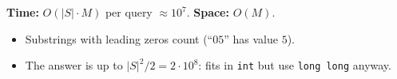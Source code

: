 \begin{complexitybox}
\textbf{Time:} $O(|S|\cdot M)$ per query $\approx10^7$. \textbf{Space:} $O(M)$.
\end{complexitybox}

\begin{pitfallbox}
\begin{itemize}
  \item Substrings with leading zeros count (``$05$'' has value $5$).
  \item The answer is up to $|S|^2/2=2\cdot10^8$: fits in \texttt{int} but use
        \texttt{long long} anyway.
\end{itemize}
\end{pitfallbox}
